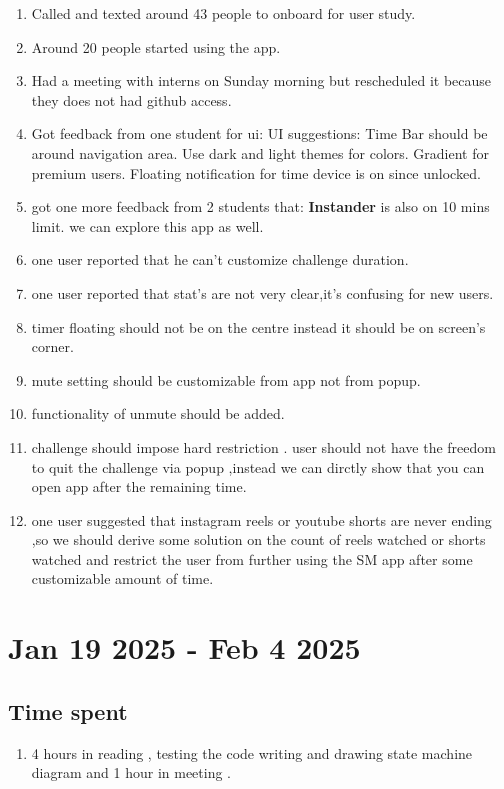 \documentclass[12pt]{article}
\begin{document}
    \begin{enumerate}
        \item Called and texted around 43 people to onboard for user study.
        \item Around 20 people started using the app.
        \item Had a meeting with interns on Sunday morning but rescheduled it because they does not had github access.
        \item Got feedback from one student for ui:
        UI suggestions:
    Time Bar should be around navigation area. Use dark and light themes for colors. Gradient for premium users.
    Floating notification for time device is on since unlocked.
    \item got one more feedback from 2 students that:
    \textbf{Instander} is also on 10 mins limit. we can explore this app as well.
    \item one user reported that he can't customize challenge duration.
    \item one user reported that stat's are not very clear,it's confusing for new users.
    \item timer floating should not be on the centre instead it should be on screen's corner.
    \item mute setting should be customizable from app not from popup.
    \item functionality of unmute should be added.
    \item challenge should impose hard restriction . user should not have the freedom to quit the challenge via popup ,instead we can dirctly show that you can open app after the remaining time.
    \item one user suggested that instagram reels or youtube shorts are never ending ,so we should derive some solution on the count of reels watched or shorts watched and restrict the user from further using the SM app after some customizable amount of time.
    \end{enumerate}
    
    \section{Jan 19 2025 - Feb 4 2025}
    \subsection{Time spent}
    \begin{enumerate}
        \item 4 hours in reading , testing the code writing and drawing state machine diagram and 1 hour in meeting .
    \end{enumerate}
\end{document}
